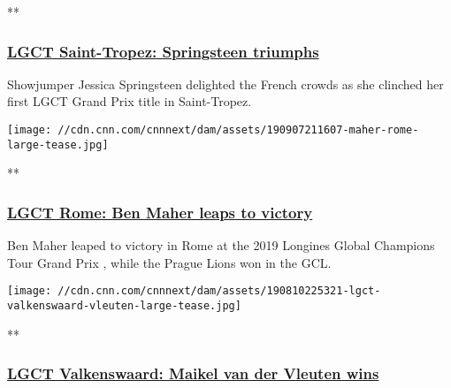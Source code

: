 **

\hypertarget{lgct-saint-tropez-springsteen-triumphs}{%
\subsubsection{\texorpdfstring{\href{/videos/sports/2019/09/16/st-tropez-global-champions-tour-review-gcl-jessica-springsteen-cnneq-vision-spt-intl.cnn}{LGCT
Saint-Tropez: Springsteen
triumphs}}{LGCT Saint-Tropez: Springsteen triumphs}}\label{lgct-saint-tropez-springsteen-triumphs}}

Showjumper Jessica Springsteen delighted the French crowds as she
clinched her first LGCT Grand Prix title in Saint-Tropez.

\href{/videos/sports/2019/09/09/rome-review-longines-global-champions-tour-gcl-ben-maher-2019-cnneq-spt-intl-vision.cnn}{}

\texttt{[image: //cdn.cnn.com/cnnnext/dam/assets/190907211607-maher-rome-large-tease.jpg]}

**

\hypertarget{lgct-rome-ben-maher-leaps-to-victory}{%
\subsubsection{\texorpdfstring{\href{/videos/sports/2019/09/09/rome-review-longines-global-champions-tour-gcl-ben-maher-2019-cnneq-spt-intl-vision.cnn}{LGCT
Rome: Ben Maher leaps to
victory}}{LGCT Rome: Ben Maher leaps to victory}}\label{lgct-rome-ben-maher-leaps-to-victory}}

Ben Maher leaped to victory in Rome at the 2019 Longines Global
Champions Tour Grand Prix , while the Prague Lions won in the GCL.

\href{/videos/sports/2019/08/12/valkenswaard-global-champions-tour-review-gcl-maikel-van-der-vleuten-cnneq-vision-spt-intl.cnn}{}

\texttt{[image: //cdn.cnn.com/cnnnext/dam/assets/190810225321-lgct-valkenswaard-vleuten-large-tease.jpg]}

**

\hypertarget{lgct-valkenswaard-maikel-van-der-vleuten-wins}{%
\subsubsection{\texorpdfstring{\href{/videos/sports/2019/08/12/valkenswaard-global-champions-tour-review-gcl-maikel-van-der-vleuten-cnneq-vision-spt-intl.cnn}{LGCT
Valkenswaard: Maikel van der Vleuten
wins}}{LGCT Valkenswaard: Maikel van der Vleuten wins}}\label{lgct-valkenswaard-maikel-van-der-vleuten-wins}}

